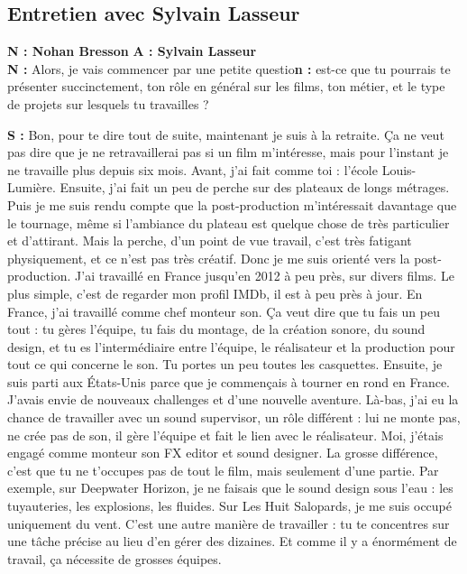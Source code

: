 ﻿\documentclass[12pt]{article}
\begin{document}
\subsection{Entretien avec Sylvain Lasseur}
\setlength{\parindent}{0pt}
\textbf{N : Nohan Bresson 
} 
\textbf{A : Sylvain Lasseur}  
\\

\textbf{N :} Alors, je vais commencer par une petite questio\textbf{n :} est-ce que tu pourrais te présenter succinctement, ton rôle en général sur les films, ton métier, et le type de projets sur lesquels tu travailles ?

\textbf{S :} Bon, pour te dire tout de suite, maintenant je suis à la retraite. Ça ne veut pas dire que je ne retravaillerai pas si un film m’intéresse, mais pour l’instant je ne travaille plus depuis six mois.
Avant, j’ai fait comme toi : l’école Louis-Lumière. Ensuite, j’ai fait un peu de perche sur des plateaux de longs métrages. Puis je me suis rendu compte que la post-production m’intéressait davantage que le tournage, même si l’ambiance du plateau est quelque chose de très particulier et d’attirant.
Mais la perche, d’un point de vue travail, c’est très fatigant physiquement, et ce n’est pas très créatif. Donc je me suis orienté vers la post-production. J’ai travaillé en France jusqu’en 2012 à peu près, sur divers films. Le plus simple, c’est de regarder mon profil IMDb, il est à peu près à jour.
En France, j’ai travaillé comme chef monteur son. Ça veut dire que tu fais un peu tout : tu gères l’équipe, tu fais du montage, de la création sonore, du sound design, et tu es l’intermédiaire entre l’équipe, le réalisateur et la production pour tout ce qui concerne le son. Tu portes un peu toutes les casquettes.
Ensuite, je suis parti aux États-Unis parce que je commençais à tourner en rond en France. J’avais envie de nouveaux challenges et d’une nouvelle aventure. Là-bas, j’ai eu la chance de travailler avec un sound supervisor, un rôle différent : lui ne monte pas, ne crée pas de son, il gère l’équipe et fait le lien avec le réalisateur. Moi, j’étais engagé comme monteur son FX editor et sound designer.
La grosse différence, c’est que tu ne t’occupes pas de tout le film, mais seulement d’une partie. Par exemple, sur Deepwater Horizon, je ne faisais que le sound design sous l’eau : les tuyauteries, les explosions, les fluides. Sur Les Huit Salopards, je me suis occupé uniquement du vent.
C’est une autre manière de travailler : tu te concentres sur une tâche précise au lieu d’en gérer des dizaines. Et comme il y a énormément de travail, ça nécessite de grosses équipes.
\end{document}

